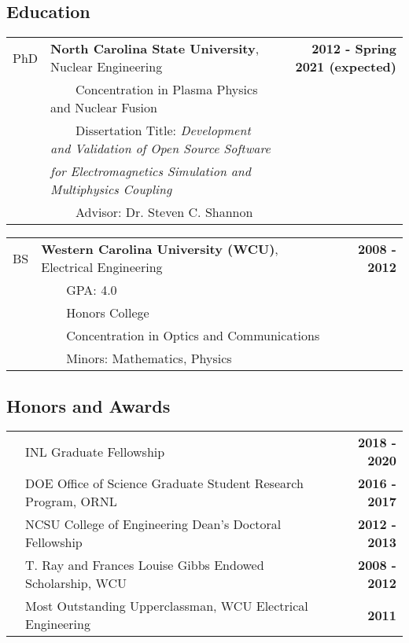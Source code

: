 \documentclass{article}
\newcommand{\tabitem}{~~\textbullet~~}
\begin{document}
\subsection*{Education}

	\begin{tabularx}{\textwidth}{l X r}
	PhD 	 & \textbf{North Carolina State University}, Nuclear Engineering & \textbf{2012 - Spring 2021 (expected)} \\
				 & \tabitem Concentration in Plasma Physics and Nuclear Fusion & \\
				 & \tabitem Dissertation Title: \textit{Development and Validation of Open Source Software} & \\
				 & \hspace{1.5em} \textit{for Electromagnetics Simulation and Multiphysics Coupling} & \\
				 & \tabitem Advisor: Dr. Steven C. Shannon & \\
	\end{tabularx}


	\noindent\begin{tabularx}{\textwidth}{l X r}
	BS		 & \textbf{Western Carolina University (WCU)}, Electrical Engineering & \textbf{2008 - 2012} \\
				 & \tabitem GPA: 4.0 & \\
				 & \tabitem Honors College & \\
				 & \tabitem Concentration in Optics and Communications & \\
				 & \tabitem Minors: Mathematics, Physics & \\
	\end{tabularx}

\subsection*{Honors and Awards}

	\begin{tabularx}{\textwidth}{l X r}
		\hspace{2em} & INL Graduate Fellowship & \textbf{2018 - 2020} \\
					       & DOE Office of Science Graduate Student Research Program, ORNL & \textbf{2016 - 2017} \\
					       & NCSU College of Engineering Dean's Doctoral Fellowship & \textbf{2012 - 2013} \\
					       & T. Ray and Frances Louise Gibbs Endowed Scholarship, WCU & \textbf{2008 - 2012} \\
					       & Most Outstanding Upperclassman, WCU Electrical Engineering & \textbf{2011}
	\end{tabularx}
\end{document}
